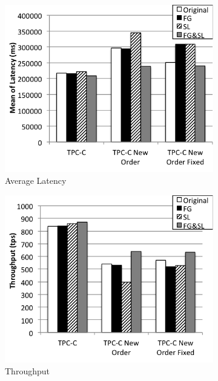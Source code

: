 \begin{figure}
    \centering
    \begin{subfigure}[t]{0.24\textwidth}
        \includegraphics[width=\textwidth]{plots/ours/latency}
        \caption{Average Latency}
        \label{fig:fix-mean}
    \end{subfigure}
    \begin{subfigure}[t]{0.24\textwidth}
        \includegraphics[width=\textwidth]{plots/ours/throughput}
        \caption{Throughput}
        \label{fig:fix-throughput}
    \end{subfigure}
    \begin{subfigure}[t]{0.24\textwidth}

\end{subfigure}
\end{figure}
